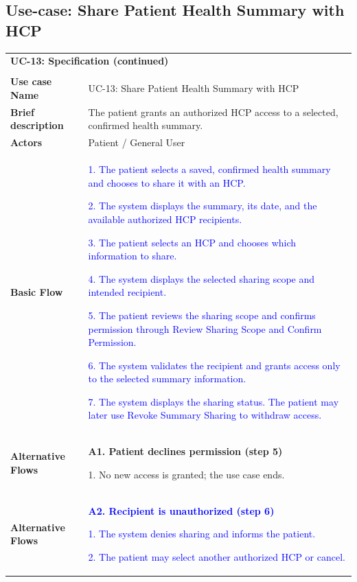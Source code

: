 \subsection{Use-case: Share Patient Health Summary with HCP}
\label{uc:uc-13}
\begin{longtable}{|p{}|p{}|}
\hline
\endfirsthead
\multicolumn{2}{l}{\textbf{UC-13: Specification (continued)}}\\\\
\hline
\endhead
\textbf{Use case Name} & UC-13: Share Patient Health Summary with HCP \\ \hline
\textbf{Brief description} &
The patient grants an authorized HCP access to a selected, confirmed health summary.
\\ \hline
\textbf{Actors} & Patient / General User \\ \hline
\textbf{Basic Flow} &
\textcolor{blue}{1. The patient selects a saved, confirmed health summary and chooses to share it with an HCP.}\par
\textcolor{blue}{2. The system displays the summary, its date, and the available authorized HCP recipients.}\par
\textcolor{blue}{3. The patient selects an HCP and chooses which information to share.}\par
\textcolor{blue}{4. The system displays the selected sharing scope and intended recipient.}\par
\textcolor{blue}{5. The patient reviews the sharing scope and confirms permission through Review Sharing Scope and Confirm Permission.}\par
\textcolor{blue}{6. The system validates the recipient and grants access only to the selected summary information.}\par
\textcolor{blue}{7. The system displays the sharing status. The patient may later use Revoke Summary Sharing to withdraw access.}
\\ \hline
\textbf{Alternative Flows} &
\textbf{A1. Patient declines permission (step 5)}\par
1. No new access is granted; the use case ends.
\\ \hline
\textbf{Alternative Flows} &
\textcolor{blue}{\textbf{A2. Recipient is unauthorized (step 6)}}\par
\textcolor{blue}{1. The system denies sharing and informs the patient.}\par
\textcolor{blue}{2. The patient may select another authorized HCP or cancel.}
\\ \hline

\end{longtable}
